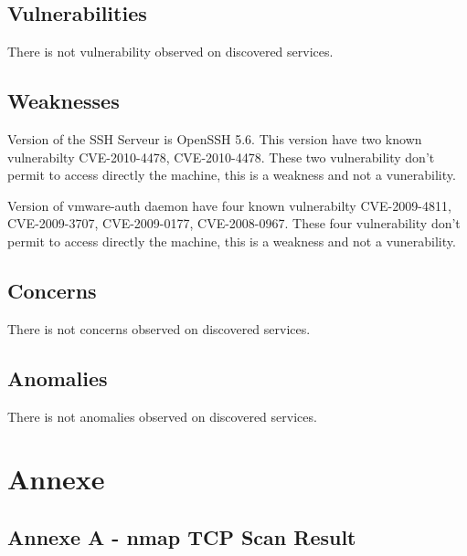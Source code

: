 \documentclass[10pt,a4paper,twoside,onecolumn]{article}
\begin{document}
\subsection{Vulnerabilities}

There is not vulnerability observed on discovered services.

\subsection{Weaknesses}

Version of the SSH Serveur is OpenSSH 5.6. This version have two known vulnerabilty CVE-2010-4478, CVE-2010-4478. These two vulnerability don't permit to access directly the machine, this is a weakness and not a vunerability.

Version of vmware-auth daemon have four known vulnerabilty CVE-2009-4811, CVE-2009-3707, CVE-2009-0177, CVE-2008-0967. These four vulnerability don't permit to access directly the machine, this is a weakness and not a vunerability.

\subsection{Concerns}

There is not concerns observed on discovered services.

\subsection{Anomalies}

There is not anomalies observed on discovered services.


\clearpage

\section{Annexe}

\subsection{Annexe A - nmap TCP Scan Result}
\end{document}
